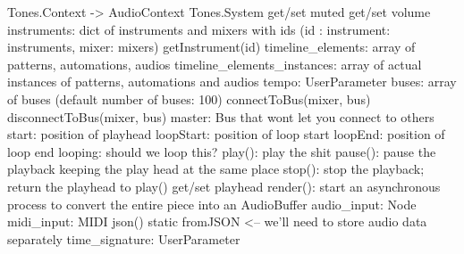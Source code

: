 \documentclass{article}
\begin{document}
Tones.Context -> AudioContext
Tones.System
  get/set muted
  get/set volume
  instruments: dict of instruments and mixers with ids (id : {instrument: instruments, mixer: mixers})
  getInstrument(id)
  timeline_elements: array of patterns, automations, audios
  timeline_elements_instances: array of actual instances of patterns, automations and audios
  tempo: UserParameter
  buses: array of buses (default number of buses: 100)
  connectToBus(mixer, bus)
  disconnectToBus(mixer, bus)
  master: Bus that wont let you connect to others
  start: position of playhead
  loopStart: position of loop start
  loopEnd: position of loop end
  looping: should we loop this?
  play(): play the shit
  pause(): pause the playback keeping the play head at the same place
  stop(): stop the playback; return the playhead to play()
  get/set playhead
  render(): start an asynchronous process to convert the entire piece into an AudioBuffer
  audio_input: Node
  midi_input: MIDI
  json()
  static fromJSON <-- we'll need to store audio data separately
  time_signature: UserParameter
\end{document}
